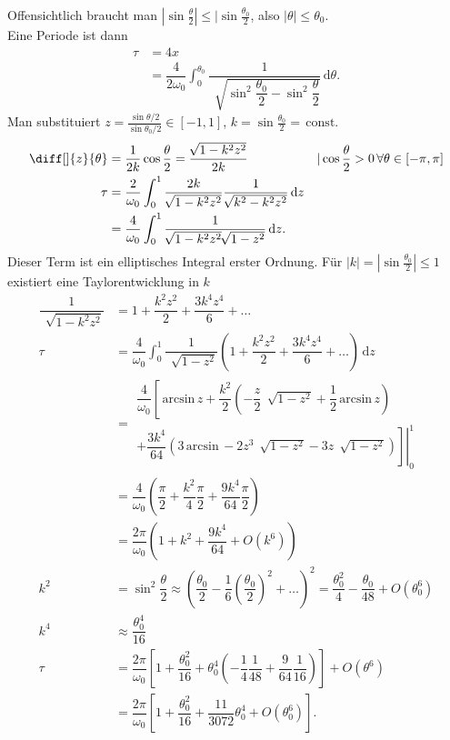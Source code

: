 \documentclass[a4paper,12pt]{article}
\newcommand{\td}{\,\text{d}}
\numberwithin{equation}{section}
\begin{document}
Offensichtlich braucht man $|\sin \tfrac{\theta }{2}|\leq |\sin \tfrac{\theta _0}{2}$, also $|\theta |\leq \theta _0$.\\\indent
Eine Periode ist dann
\begin{align*} 
        \tau &=4x \\
             &=\dfrac{4}{2\omega _0}\int_{0}^{\theta _0}\dfrac{1}{\,\sqrt[]{\sin ^2\dfrac{\theta _0}{2}-\sin ^2\dfrac{\theta }{2} }}\td \theta 
.\end{align*} 
Man substituiert $z=\tfrac{\sin \theta /2}{\sin \theta _0/2} \in \left[-1,1\right]$, $k=\sin \tfrac{\theta _0}{2}=\,\text{const.}\,$
\begin{align} 
        \diff[]{z}{\theta }&=\dfrac{1}{2k}\cos \dfrac{\theta }{2}=\dfrac{\,\sqrt[]{1-k^2z^2}}{2k}&&|\cos \dfrac{\theta }{2}>0\,\forall \theta  \in \left[-\pi ,\pi \right]\nonumber \\
        \tau &=\dfrac{2}{\omega _0}\int_{0}^{1}\dfrac{2k}{\,\sqrt[]{1-k^2z^2}}\dfrac{1}{\,\sqrt[]{k^2-k^2z^2}}\td z\nonumber \\
             &=\dfrac{4}{\omega _0}\int_{0}^{1}\dfrac{1}{\,\sqrt[]{1-k^2z^2}\,\sqrt[]{1-z^2}}\td z
.\end{align} 
Dieser Term ist ein elliptisches Integral erster Ordnung. Für $|k|=|\sin \tfrac{\theta _0}{2}|\leq 1$ existiert eine Taylorentwicklung in $k$
\begin{align} 
        \dfrac{1}{\,\sqrt[]{1-k^2z^2}}&=1+\dfrac{k^2z^2}{2}+\dfrac{3k^4z^4}{6}+\hdots \nonumber \\
        \tau &=\dfrac{4}{\omega _0}\int_{0}^{1}\dfrac{1}{\,\sqrt[]{1-z^2}}\left(1+\dfrac{k^2z^2}{2}+\dfrac{3k^4z^4}{6}+\hdots\right)\td z\nonumber \\
             &=\begin{aligned}
             \dfrac{4}{\omega _0}\left[\,\text{arcsin}\,z+\dfrac{k^2}{2}\left(-\dfrac{z}{2}\,\sqrt[]{1-z^2}+\dfrac{1}{2}\,\text{arcsin}\,z\right)\right.\\+\left.\left.\dfrac{3k^4}{64}\left(3\,\text{arcsin}\,-2z^3\,\sqrt[]{1-z^2}-3z\,\sqrt[]{1-z^2}\right)\right]\right|_0^1\end{aligned}\nonumber \\
             &=\dfrac{4}{\omega _0}\left(\dfrac{\pi }{2}+\dfrac{k^2}{4}\dfrac{\pi }{2}+\dfrac{9k^4}{64}\dfrac{\pi }{2}\right)\nonumber \\
             &=\dfrac{2\pi }{\omega _0}\left(1+k^2+\dfrac{9k^4}{64}+O\left(k^6\right)\right)\label{eq:9.12}\\
        k^2&=\sin ^2\dfrac{\theta }{2}\approx \left(\dfrac{\theta _0}{2}-\dfrac{1}{6}\left(\dfrac{\theta _0}{2}\right)^2+\hdots \right)^2=\dfrac{\theta _0^2}{4}-\dfrac{\theta _0}{48}+O\left(\theta _0^6\right)\nonumber \\
        k^4&\approx \dfrac{\theta _0^4}{16}\nonumber \\
        \tau &=\dfrac{2\pi }{\omega _0}\left[1+\dfrac{\theta _0^2}{16}+\theta _0^4\left(-\dfrac{1}{4}\dfrac{1}{48}+\dfrac{9}{64}\dfrac{1}{16}\right)\right]+O\left(\theta ^6\right)\nonumber \\
             &=\dfrac{2\pi }{\omega _0}\left[1+\dfrac{\theta _0^2}{16}+\dfrac{11}{3072}\theta _0^4+O\left(\theta _0^6\right)\right]\label{eq:9.13}
.\end{align} 
\end{document}
